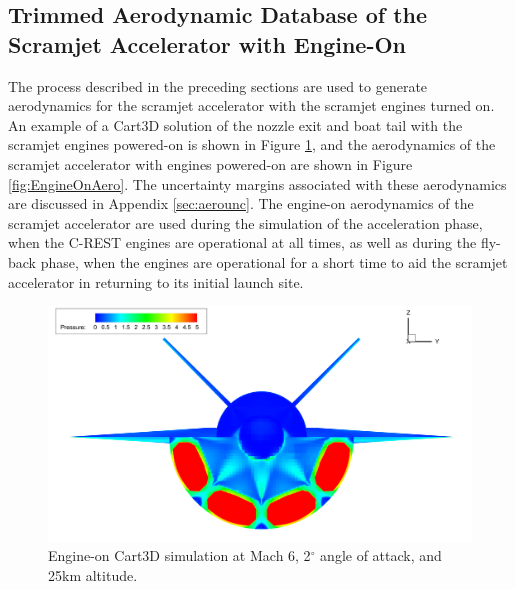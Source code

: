 		\subsection{Trimmed Aerodynamic Database of the Scramjet Accelerator with Engine-On}\label{sec:trimmedongineon}
The process described in the preceding sections are used to generate aerodynamics for the scramjet accelerator with the scramjet engines turned on. An example of a Cart3D solution of the nozzle exit and boat tail with the scramjet engines powered-on is shown in Figure \ref{fig:EngineOn}, and the aerodynamics of the scramjet accelerator with engines powered-on are shown in Figure \ref{fig:EngineOnAero}. The uncertainty margins associated with these aerodynamics are discussed in Appendix \ref{sec:aerounc}.
		The engine-on aerodynamics of the scramjet accelerator are used during the simulation of the acceleration phase, when the C-REST engines are operational at all times, as well as during the fly-back phase, when the engines are operational for a short time to aid the scramjet accelerator in returning to its initial launch site.
		\begin{figure}[ht]
			\centering
			\includegraphics[width=0.9\linewidth]{figures/3_vehicle_design/EngineOn}
			\caption{Engine-on Cart3D simulation at Mach 6, 2$^\circ$ angle of attack, and 25km altitude.}
			\label{fig:EngineOn}
		\end{figure}

